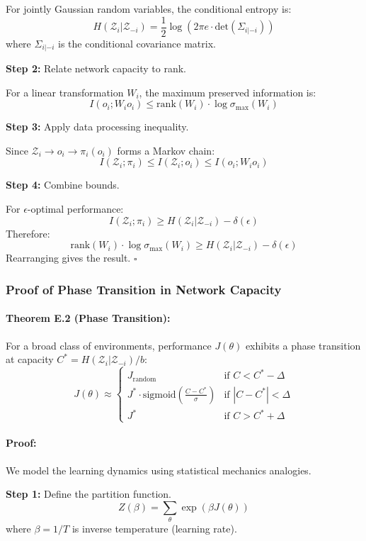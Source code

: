 \documentclass[10pt, letterpaper]{article}
\begin{document}
For jointly Gaussian random variables, the conditional entropy is:
\[H(\mathcal{Z}_i | \mathcal{Z}_{-i}) = \frac{1}{2} \log(2\pi e \cdot \text{det}(\Sigma_{i|-i}))\]
where $\Sigma_{i|-i}$ is the conditional covariance matrix.

\textbf{Step 2:} Relate network capacity to rank.

For a linear transformation $W_i$, the maximum preserved information is:
\[I(o_i; W_i o_i) \leq \text{rank}(W_i) \cdot \log \sigma_{\max}(W_i)\]

\textbf{Step 3:} Apply data processing inequality.

Since $\mathcal{Z}_i \to o_i \to \pi_i(o_i)$ forms a Markov chain:
\[I(\mathcal{Z}_i; \pi_i) \leq I(\mathcal{Z}_i; o_i) \leq I(o_i; W_i o_i)\]

\textbf{Step 4:} Combine bounds.

For $\epsilon$-optimal performance:
\[I(\mathcal{Z}_i; \pi_i) \geq H(\mathcal{Z}_i | \mathcal{Z}_{-i}) - \delta(\epsilon)\]
Therefore:
\[\text{rank}(W_i) \cdot \log \sigma_{\max}(W_i) \geq H(\mathcal{Z}_i | \mathcal{Z}_{-i}) - \delta(\epsilon)\]
Rearranging gives the result. $\square$

\subsubsection{Proof of Phase Transition in Network Capacity}

\paragraph{Theorem E.2 (Phase Transition):} For a broad class of environments, performance $J(\theta)$ exhibits a phase transition at capacity $C^* = H(\mathcal{Z}_i | \mathcal{Z}_{-i})/b$:
\[J(\theta) \approx \begin{cases}
J_{\text{random}} & \text{if } C < C^* - \Delta \\
J^* \cdot \text{sigmoid}(\frac{C - C^*}{\sigma}) & \text{if } |C - C^*| < \Delta \\
J^* & \text{if } C > C^* + \Delta
\end{cases}\]

\paragraph{Proof:}

We model the learning dynamics using statistical mechanics analogies.

\textbf{Step 1:} Define the partition function.
\[Z(\beta) = \sum_{\theta} \exp(\beta J(\theta))\]
where $\beta = 1/T$ is inverse temperature (learning rate).
\end{document}

